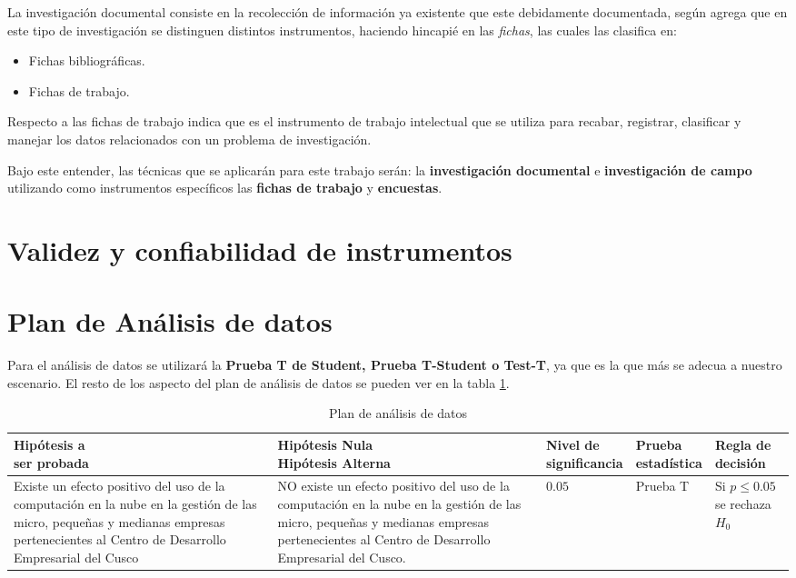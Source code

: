 La investigación documental consiste en la recolección de información ya existente
que este debidamente documentada, según \cite{robledo} agrega que en este tipo
de investigación se distinguen distintos instrumentos, haciendo hincapié en las
\emph{fichas}, las cuales \citep{robledo} las clasifica en:
\begin{itemize}
    \item Fichas bibliográficas.
    \item Fichas de trabajo.
\end{itemize}

Respecto a las fichas de trabajo \cite{robledo} indica que es el instrumento de
trabajo intelectual que se utiliza para recabar, registrar, clasificar y
manejar los datos relacionados con un problema de investigación.

Bajo este entender, las técnicas que se aplicarán para este trabajo serán:
la \textbf{investigación documental} e \textbf{investigación de campo} utilizando
como instrumentos específicos las \textbf{fichas de trabajo} y \textbf{encuestas}.

\section{Validez y confiabilidad de instrumentos}

\section{Plan de Análisis de datos}
Para el análisis de datos se utilizará la \textbf{Prueba T de Student, Prueba
T-Student o Test-T}, ya que es la que más se adecua a nuestro escenario. El resto
de los aspecto del plan de análisis de datos se pueden ver en la tabla \ref{t:analisis_datos}.

\begin{table}[htbp]
\centering
\caption{Plan de análisis de datos}
\label{t:analisis_datos}
\begin{tabular}{|p{4cm}|p{4cm}|p{2cm}|p{2cm}|p{2cm}|}
  \hline
      \thead{Hipótesis a \\ser probada} & \thead{Hipótesis Nula \\Hipótesis Alterna} & \thead{Nivel de \\significancia} & \thead{Prueba \\estadística} & \thead{Regla de \\decisión} \\ \hline
Existe un efecto positivo del uso de la computación en la nube en la gestión de las micro,
pequeñas y medianas empresas pertenecientes al Centro de Desarrollo Empresarial del Cusco &
NO existe un efecto positivo del uso de la computación en la nube en la gestión
de las micro, pequeñas y medianas empresas pertenecientes al Centro de Desarrollo
Empresarial del Cusco. &
$0.05$ & Prueba T & Si $p \leq 0.05$ se rechaza $H_0$\\ \hline
\end{tabular}
\end{table}
